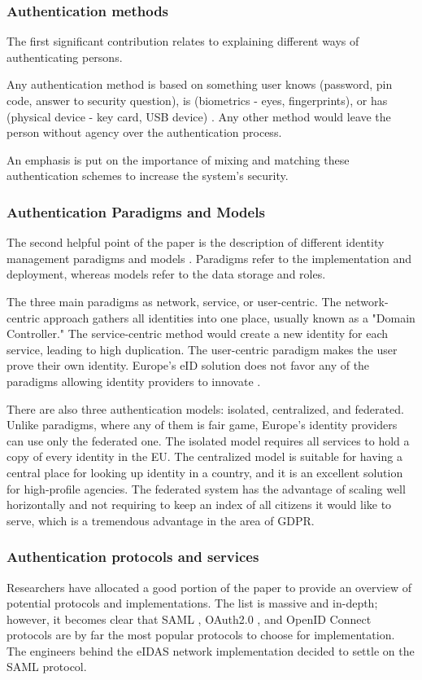 \subsubsection{Authentication methods}

The first significant contribution relates to explaining different ways of authenticating persons.

Any authentication method is based on something user knows (password, pin code, answer to security question), is (biometrics - eyes, fingerprints), or has (physical device - key card, USB device) \cite{o2003comparing}. Any other method would leave the person without agency over the authentication process.

An emphasis is put on the importance of mixing and matching these authentication schemes to increase the system's security.

\subsubsection{Authentication Paradigms and Models}

The second helpful point of the paper is the description of different identity management paradigms and models \cite{identity-paradigms}. Paradigms refer to the implementation and deployment, whereas models refer to the data storage and roles.

The three main paradigms as network, service, or user-centric. The network-centric approach gathers all identities into one place, usually known as a "Domain Controller." The service-centric method would create a new identity for each service, leading to high duplication. The user-centric paradigm makes the user prove their own identity. Europe's eID solution does not favor any of the paradigms allowing identity providers to innovate \cite{eelaw-idcard,eeid,dokobit}.

There are also three authentication models: isolated, centralized, and federated. Unlike paradigms, where any of them is fair game, Europe's identity providers can use only the federated one. The isolated model requires all services to hold a copy of every identity in the EU. The centralized model is suitable for having a central place for looking up identity in a country, and it is an excellent solution for high-profile agencies. The federated system has the advantage of scaling well horizontally and not requiring to keep an index of all citizens it would like to serve, which is a tremendous advantage in the area of GDPR.

\subsubsection{Authentication protocols and services}

Researchers have allocated a good portion of the paper to provide an overview of potential protocols and implementations. The list is massive and in-depth; however, it becomes clear that SAML \cite{saml}, OAuth2.0 \cite{rfc6749}, and OpenID Connect \cite{oidc} protocols are by far the most popular protocols to choose for implementation. The engineers behind the eIDAS network implementation decided to settle on the SAML protocol.